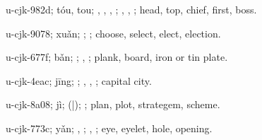 \begin{multicols}{2}
{\cjkgGlue{}u-cjk-982d; tóu, tou; \cjkgGlue{}, \cjkgGlue{}, \cjkgGlue{}, \cjkgGlue{}; \cjkgGlue{}, \cjkgGlue{}, \cjkgGlue{}; head, top, chief, first, boss.

\cjkgGlue{}u-cjk-9078; xuǎn; \cjkgGlue{}\cjkgGlue{}\cjkgGlue{}; \cjkgGlue{}; choose, select, elect, election.

\cjkgGlue{}u-cjk-677f; bǎn; \cjkgGlue{}; \cjkgGlue{}, \cjkgGlue{}; plank, board, iron or tin plate.

\cjkgGlue{}u-cjk-4eac; jīng; \cjkgGlue{}; \cjkgGlue{}, \cjkgGlue{}, \cjkgGlue{}; capital city.

\cjkgGlue{}u-cjk-8a08; jì; \cjkgGlue{}\cjkgGlue{}(\cjkgGlue{}|\cjkgGlue{}); \cjkgGlue{}; plan, plot, strategem, scheme.

\cjkgGlue{}u-cjk-773c; yǎn; \cjkgGlue{}, \cjkgGlue{}; \cjkgGlue{}, \cjkgGlue{}; eye, eyelet, hole, opening.

}
\end{multicols}
